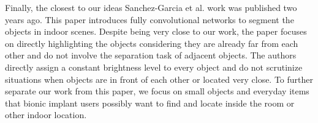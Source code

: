 Finally, the closest to our ideas Sanchez-Garcia et al. \cite{visapp19} work was published two years ago. This paper introduces fully convolutional networks to segment the objects in indoor scenes. Despite being very close to our work, the paper focuses on directly highlighting the objects considering they are already far from each other and do not involve the separation task of adjacent objects. The authors directly assign a constant brightness level to every object and do not scrutinize situations when objects are in front of each other or located very close. To further separate our work from this paper, we focus on small objects and everyday items that bionic implant users possibly want to find and locate inside the room or other indoor location.
